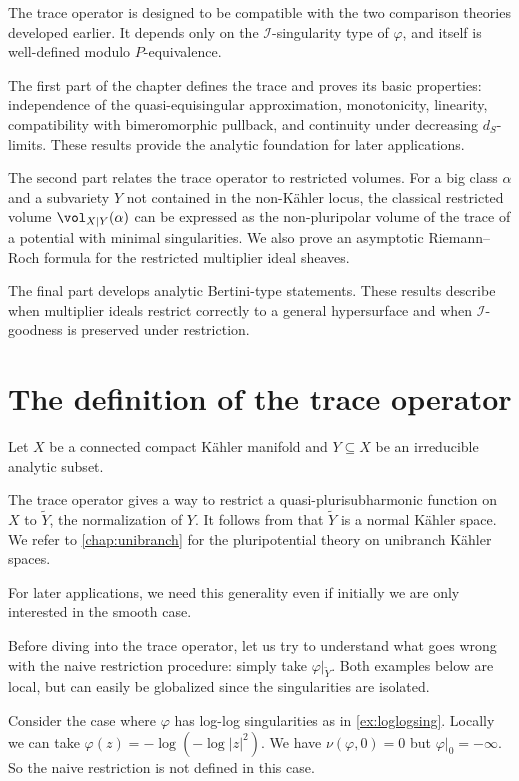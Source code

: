 The trace operator is designed to be compatible with the two comparison theories developed earlier. It depends only on the $\mathcal{I}$-singularity type of $\varphi$, and itself is well-defined modulo $P$-equivalence.

The first part of the chapter defines the trace and proves its basic properties: independence of the quasi-equisingular approximation, monotonicity, linearity, compatibility with bimeromorphic pullback, and continuity under decreasing $d_S$-limits. These results provide the analytic foundation for later applications.

The second part relates the trace operator to restricted volumes. For a big class $\alpha$ and a subvariety $Y$ not contained in the non-K\"ahler locus, the classical restricted volume $\vol_{X|Y}(\alpha)$ can be expressed as the non-pluripolar volume of the trace of a potential with minimal singularities. We also prove an asymptotic Riemann--Roch formula for the restricted multiplier ideal sheaves.

The final part develops analytic Bertini-type statements. These results describe when multiplier ideals restrict correctly to a general hypersurface and when $\mathcal I$-goodness is preserved under restriction.


\section{The definition of the trace operator}\label{sec:trace_def}

Let $X$ be a connected compact Kähler manifold and $Y\subseteq X$ be an irreducible analytic subset.

The trace operator gives a way to restrict a quasi-plurisubharmonic function on $X$ to $\widetilde{Y}$, the normalization of $Y$.
It follows from \cite[Proposition~3.6]{GK20} that $\widetilde{Y}$ is a normal Kähler space.
We refer to \cref{chap:unibranch} for the pluripotential theory on unibranch Kähler spaces.

For later applications, we need this generality even if initially we are only interested in the smooth case.


Before diving into the trace operator, let us try to understand what goes wrong with the naive restriction procedure: simply take $\varphi|_{\widetilde{Y}}$. Both examples below are local, but can easily be globalized since the singularities are isolated.
\begin{example}\label{ex:naive_res1}
    Consider the case where $\varphi$ has log-log singularities as in \cref{ex:loglogsing}. Locally we can take $\varphi(z)=-\log (-\log |z|^2)$. We have $\nu(\varphi,0)=0$ but $\varphi|_0=-\infty$. So the naive restriction is not defined in this case.
\end{example}

